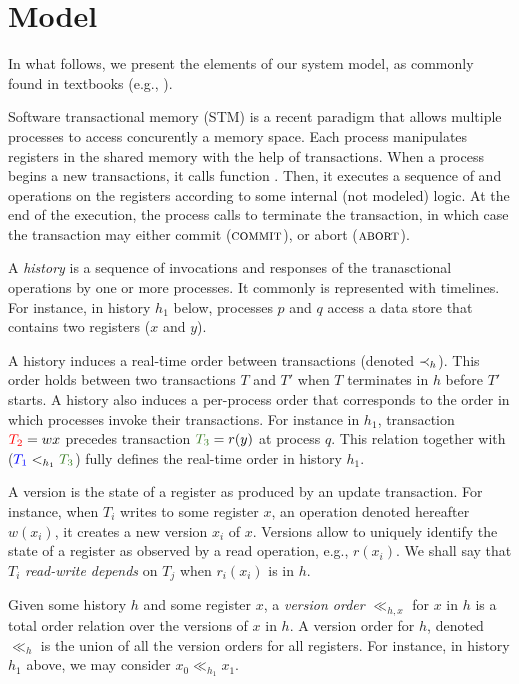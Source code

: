 \section{Model}

In what follows, we present the elements of our system model, as commonly found in textbooks (e.g., \cite{}).

Software transactional memory (STM) is a recent paradigm that allows multiple processes to access concurently a memory space.
Each process manipulates registers in the shared memory with the help of transactions.
When a process begins a new transactions, it calls function \stmBeginFunction.
Then, it executes a sequence of \stmReadFunction and \stmWriteFunction operations on the registers according to some internal (not modeled) logic.
At the end of the execution, the process calls \stmTryCommitFunction to terminate the transaction, in which case the transaction may either commit ($\text{\textsc{commit}}$), or abort ($\text{\textsc{abort}}$).

A \emph{history} is a sequence of invocations and responses of the tranasctional operations by one or more processes.
It commonly is represented with timelines.
For instance, in history $h_1$ below, processes $p$ and $q$ access a data store that contains two registers ($x$ and $y$).


A history induces a real-time order between transactions (denoted $\hb_h$).
This order holds between two transactions $T$ and $T'$ when $T$ terminates in $h$ before $T'$ starts.
A history also induces a per-process order that corresponds to the order in which processes invoke their transactions.
For instance in $h_1$, transaction ${\color{red}{T_2}}=w{x}$ precedes transaction ${\color{OliveGreen}{T_3}}=r(y)$ at process $q$.
This relation together with (${\color{blue}{T_1}} <_{h_1} {\color{OliveGreen}{T_3}}$) fully defines the real-time order in history $h_1$.

A version is the state of a register as produced by an update transaction.
For instance, when $T_i$ writes to some register $x$, an operation denoted hereafter $w(x_i)$, it creates a new version $x_i$ of $x$.
Versions allow to uniquely identify the state of a register as observed by a read operation, e.g., $r(x_i)$.
We shall say that $T_i$ \emph{read-write depends} on $T_j$ when $r_i(x_i)$ is in $h$.

Given some history $h$ and some register $x$, a \emph{version order} $\ll_{h,x}$ for $x$ in $h$ is a total order relation over the versions of $x$ in $h$.
A version order for $h$, denoted $\ll_{h}$ is the union of all the version orders for all registers.
For instance, in history $h_1$ above,  we may consider $x_0 \ll_{h_1} x_1$.

